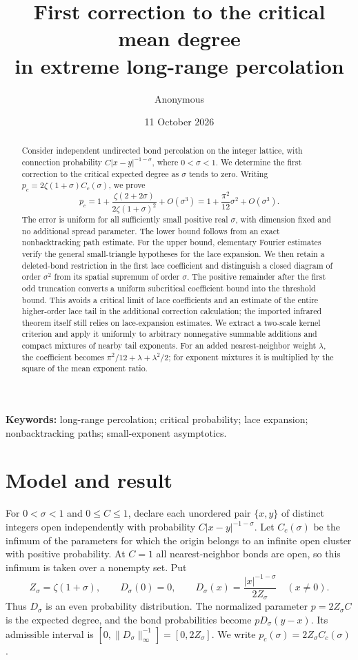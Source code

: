 \documentclass[11pt]{article}
\title{First correction to the critical mean degree\protect\\
in extreme long-range percolation}
\author{Anonymous}
\date{11 October 2026}
\theoremstyle{definition}
\begin{document}
\maketitle

\begin{abstract}
Consider independent undirected bond percolation on the integer lattice, with
connection probability $C|x-y|^{-1-\sigma}$, where $0<\sigma<1$. We determine
the first correction to the critical expected degree as $\sigma$ tends to zero.
Writing $p_c=2\zeta(1+\sigma)C_c(\sigma)$, we prove
\[
 p_c=1+\frac{\zeta(2+2\sigma)}{2\zeta(1+\sigma)^2}+O(\sigma^3)
     =1+\frac{\pi^2}{12}\sigma^2+O(\sigma^3).
\]
The error is uniform for all sufficiently small positive real $\sigma$, with
dimension fixed and no additional spread parameter. The lower bound follows
from an exact nonbacktracking path estimate. For the upper bound, elementary
Fourier estimates verify the general small-triangle hypotheses for the lace
expansion. We then retain a deleted-bond restriction in the first lace
coefficient and distinguish a closed diagram of order $\sigma^2$ from its
spatial supremum of order $\sigma$. The positive remainder after the first odd
truncation converts a uniform subcritical coefficient bound into the threshold
bound. This avoids a critical limit of lace coefficients and an estimate of
the entire higher-order lace tail in the additional correction calculation;
the imported infrared theorem itself still relies on lace-expansion estimates.
We extract a two-scale kernel criterion and apply it uniformly to arbitrary
nonnegative summable additions and compact mixtures of nearby tail exponents.
For an added nearest-neighbor weight $\lambda$, the coefficient becomes
$\pi^2/12+\lambda+\lambda^2/2$; for exponent mixtures it is multiplied by
the square of the mean exponent ratio.
\end{abstract}

\noindent\textbf{Keywords:} long-range percolation; critical probability;
lace expansion; nonbacktracking paths; small-exponent asymptotics.

\section{Model and result}

For $0<\sigma<1$ and $0\le C\le1$, declare each unordered pair
$\{x,y\}$ of distinct integers open independently with probability
$C|x-y|^{-1-\sigma}$. Let $C_c(\sigma)$ be the infimum of the parameters for
which the origin belongs to an infinite open cluster with positive probability.
At $C=1$ all nearest-neighbor bonds are open, so this infimum is taken over a
nonempty set. Put
\begin{equation}\label{eq:kernel}
 Z_\sigma=\zeta(1+\sigma),\qquad
 D_\sigma(0)=0,\qquad
 D_\sigma(x)=\frac{|x|^{-1-\sigma}}{2Z_\sigma}\quad(x\ne0).
\end{equation}
Thus $D_\sigma$ is an even probability distribution. The normalized parameter
$p=2Z_\sigma C$ is the expected degree, and the bond probabilities become
$pD_\sigma(y-x)$. Its admissible interval is
$[0,\|D_\sigma\|_\infty^{-1}]=[0,2Z_\sigma]$. We write
$p_c(\sigma)=2Z_\sigma C_c(\sigma)$.
\end{document}

